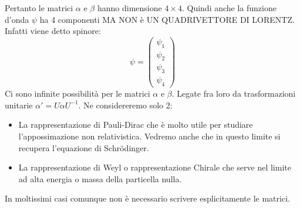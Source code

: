Pertanto le matrici $\alpha$ e $\beta$ hanno dimensione $4\times4$. Quindi anche la funzione d'onda $\psi$ ha 4 componenti MA NON è UN QUADRIVETTORE DI LORENTZ. Infatti viene detto spinore:
\begin{equation*}
    \psi = \begin{pmatrix} \psi_1 \\ \psi_2 \\ \psi_3 \\ \psi_4 \end{pmatrix}
\end{equation*}
Ci sono infinite possibilità per le matrici $\alpha$ e $\beta$. Legate fra loro da trasformazioni unitarie $\alpha'=U\alpha U^{-1}$. Ne considereremo solo 2:
\begin{itemize}
    \item La rappresentazione di Pauli-Dirac che è molto utile per studiare l'appossimazione non relativistica. Vedremo anche che in questo limite si recupera l'equazione di Schr\"odinger.
    \item La rappresentazione di Weyl o rappresentazione Chirale che serve nel limite ad alta energia o massa della particella nulla.
\end{itemize}
In moltissimi casi comunque non è necessario scrivere esplicitamente le matrici.
